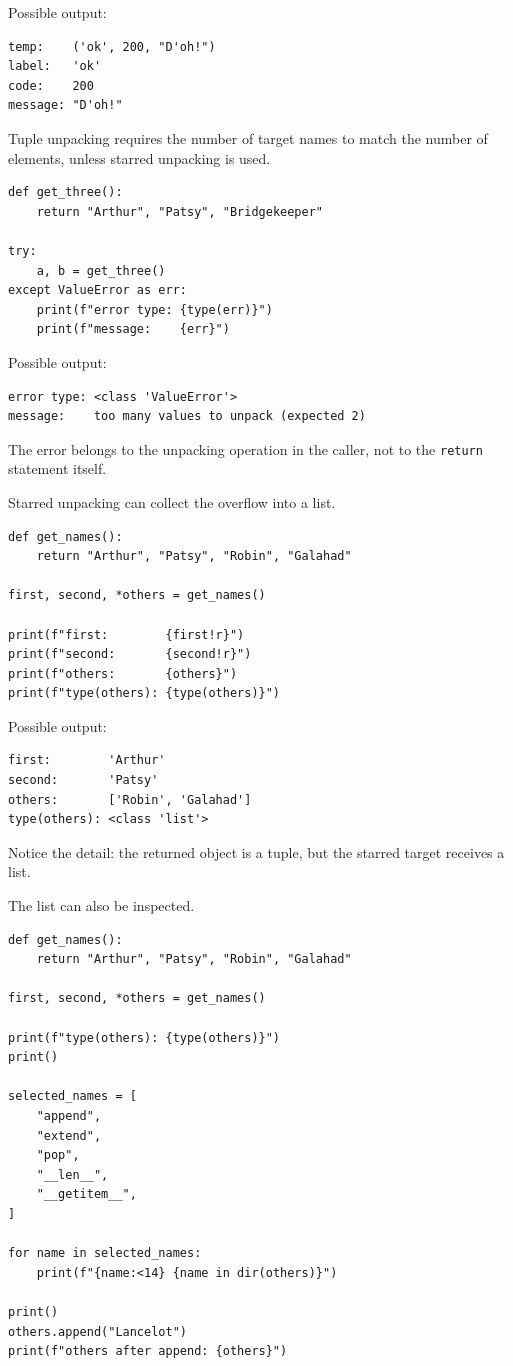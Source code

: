Possible output:

\begin{verbatim}
temp:    ('ok', 200, "D'oh!")
label:   'ok'
code:    200
message: "D'oh!"
\end{verbatim}

Tuple unpacking requires the number of target names to match the number of elements, unless starred unpacking is used.

\begin{verbatim}
def get_three():
    return "Arthur", "Patsy", "Bridgekeeper"

try:
    a, b = get_three()
except ValueError as err:
    print(f"error type: {type(err)}")
    print(f"message:    {err}")
\end{verbatim}

Possible output:

\begin{verbatim}
error type: <class 'ValueError'>
message:    too many values to unpack (expected 2)
\end{verbatim}

The error belongs to the unpacking operation in the caller, not to the \texttt{return} statement itself.

Starred unpacking can collect the overflow into a list.

\begin{verbatim}
def get_names():
    return "Arthur", "Patsy", "Robin", "Galahad"

first, second, *others = get_names()

print(f"first:        {first!r}")
print(f"second:       {second!r}")
print(f"others:       {others}")
print(f"type(others): {type(others)}")
\end{verbatim}

Possible output:

\begin{verbatim}
first:        'Arthur'
second:       'Patsy'
others:       ['Robin', 'Galahad']
type(others): <class 'list'>
\end{verbatim}

Notice the detail: the returned object is a tuple, but the starred target receives a list.

The list can also be inspected.

\begin{verbatim}
def get_names():
    return "Arthur", "Patsy", "Robin", "Galahad"

first, second, *others = get_names()

print(f"type(others): {type(others)}")
print()

selected_names = [
    "append",
    "extend",
    "pop",
    "__len__",
    "__getitem__",
]

for name in selected_names:
    print(f"{name:<14} {name in dir(others)}")

print()
others.append("Lancelot")
print(f"others after append: {others}")
\end{verbatim}

